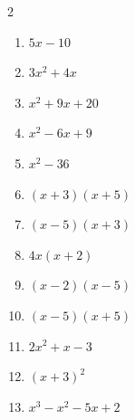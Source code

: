 \documentclass[11pt]{article}
\begin{document}
\begin{keybox}
\begin{multicols}{2}
\small
\begin{enumerate}[leftmargin=*,itemsep=3pt]
  \item $5x-10$
  \item $3x^2+4x$
  \item $x^2+9x+20$
  \item $x^2-6x+9$
  \item $x^2-36$
  \item $(x+3)(x+5)$
  \item $(x-5)(x+3)$
  \item $4x(x+2)$
  \item $(x-2)(x-5)$
  \item $(x-5)(x+5)$
  \item $2x^2+x-3$
  \item $(x+3)^2$
  \item $x^3-x^2-5x+2$
\end{enumerate}
\end{multicols}
\end{keybox}
\end{document}

